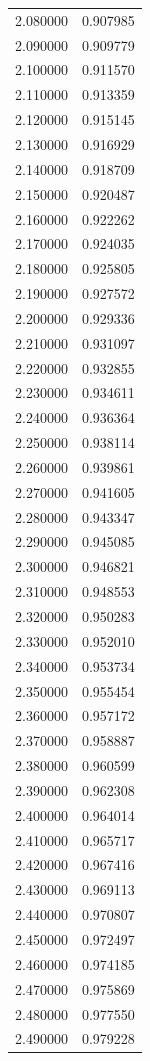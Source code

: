 \begin{tabular}{rr}
2.080000 & 0.907985 \\
2.090000 & 0.909779 \\
2.100000 & 0.911570 \\
2.110000 & 0.913359 \\
2.120000 & 0.915145 \\
2.130000 & 0.916929 \\
2.140000 & 0.918709 \\
2.150000 & 0.920487 \\
2.160000 & 0.922262 \\
2.170000 & 0.924035 \\
2.180000 & 0.925805 \\
2.190000 & 0.927572 \\
2.200000 & 0.929336 \\
2.210000 & 0.931097 \\
2.220000 & 0.932855 \\
2.230000 & 0.934611 \\
2.240000 & 0.936364 \\
2.250000 & 0.938114 \\
2.260000 & 0.939861 \\
2.270000 & 0.941605 \\
2.280000 & 0.943347 \\
2.290000 & 0.945085 \\
2.300000 & 0.946821 \\
2.310000 & 0.948553 \\
2.320000 & 0.950283 \\
2.330000 & 0.952010 \\
2.340000 & 0.953734 \\
2.350000 & 0.955454 \\
2.360000 & 0.957172 \\
2.370000 & 0.958887 \\
2.380000 & 0.960599 \\
2.390000 & 0.962308 \\
2.400000 & 0.964014 \\
2.410000 & 0.965717 \\
2.420000 & 0.967416 \\
2.430000 & 0.969113 \\
2.440000 & 0.970807 \\
2.450000 & 0.972497 \\
2.460000 & 0.974185 \\
2.470000 & 0.975869 \\
2.480000 & 0.977550 \\
2.490000 & 0.979228 \\

\end{tabular}
